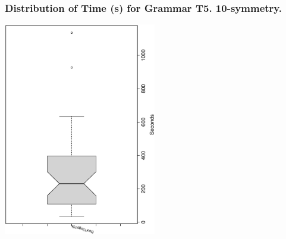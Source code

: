  \begin{frame}
 \frametitle{ Distribution of Time (s) for Grammar T5. 10-symmetry. }
 \begin{center}
\includegraphics[width=0.5\textwidth, angle=-90]
{ExpFboxplottSeconds008.eps}
 \end{center}
 \label{ExpFboxplottSeconds008.eps}  
 \end{frame}

